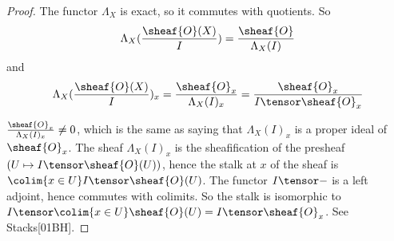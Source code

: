 
\begin{proof}
The functor $\Lambda_X$ is exact, so it commutes with quotients.
So
\[\Lambda_X(\frac{\sheaf{O}(X)}{I}) = \frac{\sheaf{O}}{\Lambda_X(I)}\]
and 
\[\Lambda_X(\frac{\sheaf{O}(X)}{I})_x = \frac{\sheaf{O}_x}{\Lambda_X(I)_x} = \frac{\sheaf{O}_x}{I\tensor \sheaf{O}_x} \]

$\frac{\sheaf{O}_x}{\Lambda_X(I)_x} \neq 0$, which is the same as saying that  $\Lambda_X(I)_x$ is a proper ideal of $\sheaf{O}_x$. 
The sheaf $\Lambda_X(I)_x$ is the sheafification of the presheaf $(U \mapsto I \tensor \sheaf{O}(U))$, hence the stalk at $x$ of the sheaf is 
$\colim{x \in U} I\tensor \sheaf{O}(U)$. The functor $I\tensor -$ is a left adjoint, hence commutes with colimits.
So the stalk is isomorphic to $I\tensor \colim{x\in U} \sheaf{O}(U)= I\tensor \sheaf{O}_x$. See Stacks[01BH].
\end{proof}